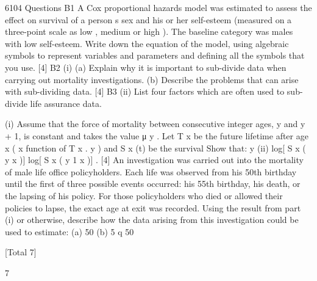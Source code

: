 \documentclass[a4paper,12pt]{article}
\begin{document}
\begin{enumerate}



 6104 Questions
B1
A Cox proportional hazards model was estimated to assess the effect on survival of a
person s sex and his or her self-esteem (measured on a three-point scale as low ,
medium or high ). The baseline category was males with low self-esteem.
Write down the equation of the model, using algebraic symbols to represent variables
and parameters and defining all the symbols that you use.
[4]
B2
(i)
(a) Explain why it is important to sub-divide data when carrying out
mortality investigations.
(b) Describe the problems that can arise with sub-dividing data.
[4]
B3
(ii) List four factors which are often used to sub-divide life assurance data.



(i) Assume that the force of mortality between consecutive integer ages, y and
y + 1, is constant and takes the value μ y .
Let T x be the future lifetime after age x ( x
function of T x .
y ) and S x (t) be the survival
Show that:
y
(ii)
log[ S x ( y x )] log[ S x ( y 1 x )] .
[4]
An investigation was carried out into the mortality of male life office
policyholders. Each life was observed from his 50th birthday until the first of
three possible events occurred: his 55th birthday, his death, or the lapsing of
his policy. For those policyholders who died or allowed their policies to lapse,
the exact age at exit was recorded.
Using the result from part (i) or otherwise, describe how the data arising from
this investigation could be used to estimate:
(a) 50
(b) 5 q 50

[Total 7]

 7










\end{enumerate}
\end{document}
